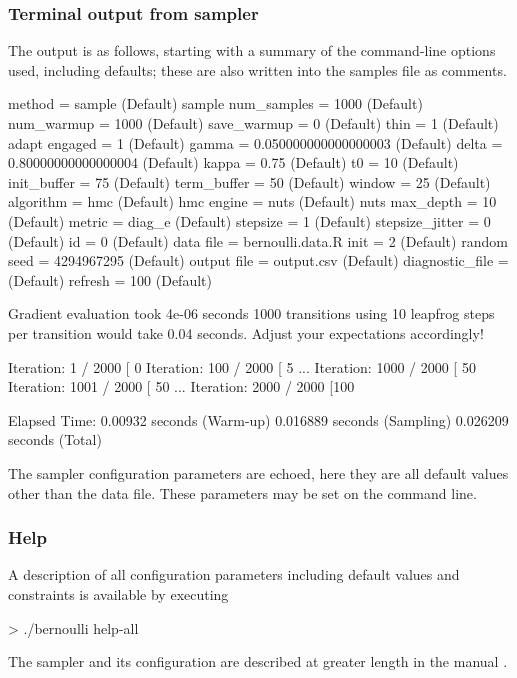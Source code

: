 \documentclass[article]{jss}
\begin{document}
\subsubsection{Terminal output from sampler}

The output is as follows, starting with a summary of the command-line
options used, including defaults;  these are also written into the 
samples file as comments.
%
\begin{Code}
 method = sample (Default)
   sample
     num_samples = 1000 (Default)
     num_warmup = 1000 (Default)
     save_warmup = 0 (Default)
     thin = 1 (Default)
     adapt
       engaged = 1 (Default)
       gamma = 0.050000000000000003 (Default)
       delta = 0.80000000000000004 (Default)
       kappa = 0.75 (Default)
       t0 = 10 (Default)
       init_buffer = 75 (Default)
       term_buffer = 50 (Default)
       window = 25 (Default)
     algorithm = hmc (Default)
       hmc
         engine = nuts (Default)
           nuts
             max_depth = 10 (Default)
         metric = diag_e (Default)
         stepsize = 1 (Default)
         stepsize_jitter = 0 (Default)
 id = 0 (Default)
 data
   file = bernoulli.data.R
 init = 2 (Default)
 random
   seed = 4294967295 (Default)
 output
   file = output.csv (Default)
   diagnostic_file =  (Default)
   refresh = 100 (Default)

Gradient evaluation took 4e-06 seconds
1000 transitions using 10 leapfrog steps per transition would take
0.04 seconds.
Adjust your expectations accordingly!

Iteration:    1 / 2000 [  0%
Iteration:  100 / 2000 [  5%
...
Iteration: 1000 / 2000 [ 50%
Iteration: 1001 / 2000 [ 50%
...
Iteration: 2000 / 2000 [100%

  Elapsed Time: 0.00932 seconds (Warm-up)
                0.016889 seconds (Sampling)
                0.026209 seconds (Total)
\end{Code}
%
The sampler configuration parameters are echoed, here they are all
default values other than the data file.  These parameters may be set
on the command line.  

\subsubsection{Help}

A description of all configuration parameters including default values
and constraints is available by executing
%
\begin{CodeChunk}
\begin{CodeInput}
> ./bernoulli help-all
\end{CodeInput}
\end{CodeChunk}
%
The sampler and its configuration are described at greater length in
the manual \citep{Stan:2013}.
\end{document}
